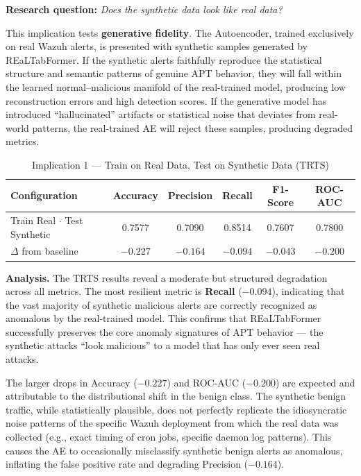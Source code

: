 \textbf{Research question:} \textit{Does the synthetic data look like real data?}

This implication tests \textbf{generative fidelity}. The Autoencoder, trained exclusively on real Wazuh alerts, is presented with synthetic samples generated by REaLTabFormer. If the synthetic alerts faithfully reproduce the statistical structure and semantic patterns of genuine APT behavior, they will fall within the learned normal--malicious manifold of the real-trained model, producing low reconstruction errors and high detection scores. If the generative model has introduced ``hallucinated'' artifacts or statistical noise that deviates from real-world patterns, the real-trained AE will reject these samples, producing degraded metrics.

\begin{table}[H]
    \centering
    \caption{Implication 1 — Train on Real Data, Test on Synthetic Data (TRTS)}
    \label{tab:trts_results}
    \begin{tabular}{lccccc}
        \toprule
        \textbf{Configuration} & \textbf{Accuracy} & \textbf{Precision} & \textbf{Recall} & \textbf{F1-Score} & \textbf{ROC-AUC} \\
        \midrule
        Train Real $\cdot$ Test Synthetic & 0.7577 & 0.7090 & 0.8514 & 0.7607 & 0.7800 \\
        \midrule
        $\Delta$ from baseline & $-0.227$ & $-0.164$ & $-0.094$ & $-0.043$ & $-0.200$ \\
        \bottomrule
    \end{tabular}
\end{table}

\textbf{Analysis.} The TRTS results reveal a moderate but structured degradation across all metrics. The most resilient metric is \textbf{Recall} ($-0.094$), indicating that the vast majority of synthetic malicious alerts are correctly recognized as anomalous by the real-trained model. This confirms that REaLTabFormer successfully preserves the core anomaly signatures of APT behavior --- the synthetic attacks ``look malicious'' to a model that has only ever seen real attacks.

The larger drops in Accuracy ($-0.227$) and ROC-AUC ($-0.200$) are expected and attributable to the distributional shift in the benign class. The synthetic benign traffic, while statistically plausible, does not perfectly replicate the idiosyncratic noise patterns of the specific Wazuh deployment from which the real data was collected (e.g., exact timing of cron jobs, specific daemon log patterns). This causes the AE to occasionally misclassify synthetic benign alerts as anomalous, inflating the false positive rate and degrading Precision ($-0.164$).


